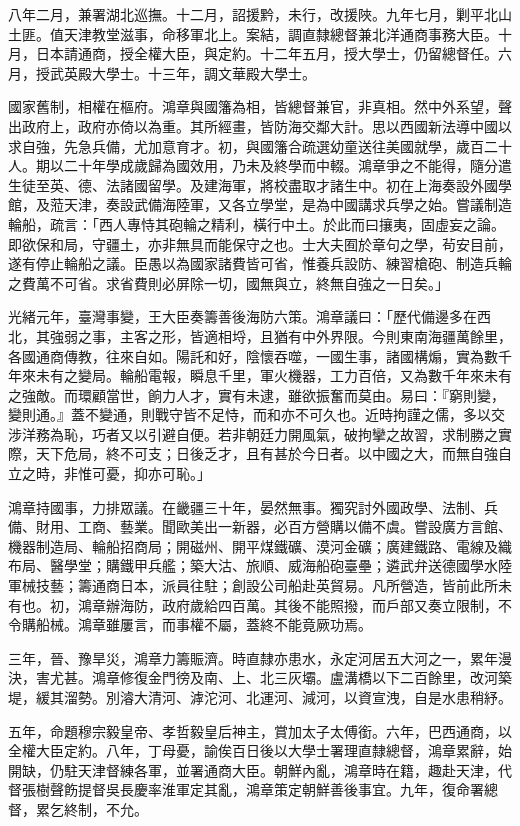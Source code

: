 \begin{pinyinscope}
八年二月，兼署湖北巡撫。十二月，詔援黔，未行，改援陜。九年七月，剿平北山土匪。值天津教堂滋事，命移軍北上。案結，調直隸總督兼北洋通商事務大臣。十月，日本請通商，授全權大臣，與定約。十二年五月，授大學士，仍留總督任。六月，授武英殿大學士。十三年，調文華殿大學士。

國家舊制，相權在樞府。鴻章與國籓為相，皆總督兼官，非真相。然中外系望，聲出政府上，政府亦倚以為重。其所經畫，皆防海交鄰大計。思以西國新法導中國以求自強，先急兵備，尤加意育才。初，與國籓合疏選幼童送往美國就學，歲百二十人。期以二十年學成歲歸為國效用，乃未及終學而中輟。鴻章爭之不能得，隨分遣生徒至英、德、法諸國留學。及建海軍，將校盡取才諸生中。初在上海奏設外國學館，及蒞天津，奏設武備海陸軍，又各立學堂，是為中國講求兵學之始。嘗議制造輪船，疏言：「西人專恃其砲輪之精利，橫行中土。於此而曰攘夷，固虛妄之論。即欲保和局，守疆土，亦非無具而能保守之也。士大夫囿於章句之學，茍安目前，遂有停止輪船之議。臣愚以為國家諸費皆可省，惟養兵設防、練習槍砲、制造兵輪之費萬不可省。求省費則必屏除一切，國無與立，終無自強之一日矣。」

光緒元年，臺灣事變，王大臣奏籌善後海防六策。鴻章議曰：「歷代備邊多在西北，其強弱之事，主客之形，皆適相埒，且猶有中外界限。今則東南海疆萬餘里，各國通商傳教，往來自如。陽託和好，陰懷吞噬，一國生事，諸國構煽，實為數千年來未有之變局。輪船電報，瞬息千里，軍火機器，工力百倍，又為數千年來未有之強敵。而環顧當世，餉力人才，實有未逮，雖欲振奮而莫由。易曰：『窮則變，變則通。』蓋不變通，則戰守皆不足恃，而和亦不可久也。近時拘謹之儒，多以交涉洋務為恥，巧者又以引避自便。若非朝廷力開風氣，破拘攣之故習，求制勝之實際，天下危局，終不可支；日後乏才，且有甚於今日者。以中國之大，而無自強自立之時，非惟可憂，抑亦可恥。」

鴻章持國事，力排眾議。在畿疆三十年，晏然無事。獨究討外國政學、法制、兵備、財用、工商、藝業。聞歐美出一新器，必百方營購以備不虞。嘗設廣方言館、機器制造局、輪船招商局；開磁州、開平煤鐵礦、漠河金礦；廣建鐵路、電線及織布局、醫學堂；購鐵甲兵艦；築大沽、旅順、威海船砲臺壘；遴武弁送德國學水陸軍械技藝；籌通商日本，派員往駐；創設公司船赴英貿易。凡所營造，皆前此所未有也。初，鴻章辦海防，政府歲給四百萬。其後不能照撥，而戶部又奏立限制，不令購船械。鴻章雖屢言，而事權不屬，蓋終不能竟厥功焉。

三年，晉、豫旱災，鴻章力籌賑濟。時直隸亦患水，永定河居五大河之一，累年漫決，害尤甚。鴻章修復金門徬及南、上、北三灰壩。盧溝橋以下二百餘里，改河築堤，緩其溜勢。別濬大清河、滹沱河、北運河、減河，以資宣洩，自是水患稍紓。

五年，命題穆宗毅皇帝、孝哲毅皇后神主，賞加太子太傅銜。六年，巴西通商，以全權大臣定約。八年，丁母憂，諭俟百日後以大學士署理直隸總督，鴻章累辭，始開缺，仍駐天津督練各軍，並署通商大臣。朝鮮內亂，鴻章時在籍，趣赴天津，代督張樹聲飭提督吳長慶率淮軍定其亂，鴻章策定朝鮮善後事宜。九年，復命署總督，累乞終制，不允。


\end{pinyinscope}

